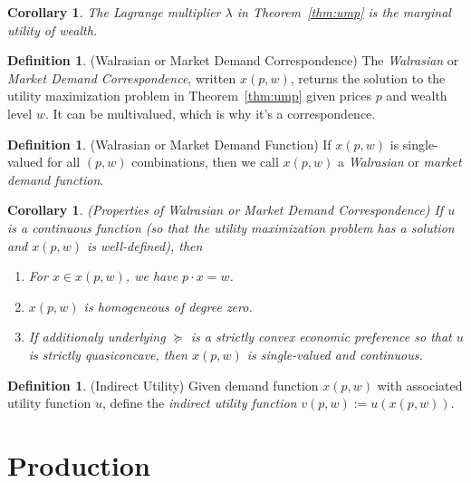 \documentclass[12pt]{article}
\theoremstyle{plain}
\newtheorem{cor}[thm]{Corollary}
\theoremstyle{definition}
\newtheorem{defn}[thm]{Definition}
\theoremstyle{remark}
\newcommand{\ra}{\rightarrow}
\newcommand{\calB}{\mathcal{B}}
\newcommand{\R}{\mathbb{R}}
\begin{document}
\begin{cor}
The Lagrange multiplier $\lambda$ in Theorem~\ref{thm:ump} is the
marginal utility of wealth.
\end{cor}

\begin{defn}(Walrasian or Market Demand Correspondence)
The \emph{Walrasian} or \emph{Market Demand Correspondence}, written
$x(p,w)$, returns the solution to the utility maximization problem in
Theorem~\ref{thm:ump} given prices $p$ and wealth level $w$.
It can be multivalued, which is why it's a correspondence.
\end{defn}

\begin{defn}(Walrasian or Market Demand Function)
If $x(p,w)$ is single-valued for all $(p,w)$ combinations, then we call
$x(p,w)$ a \emph{Walrasian} or \emph{market demand function}.
\end{defn}

\begin{cor}
\emph{(Properties of Walrasian or Market Demand Correspondence)}
If $u$ is a continuous function (so that the utility maximization
problem has a solution and $x(p,w)$ is well-defined), then
\begin{enumerate}
  \item For $x \in x(p,w)$, we have $p \cdot x = w$.
  \item $x(p,w)$ is homogeneous of degree zero.
  \item If additionaly underlying $\succeq$ is a strictly convex
    economic preference so that $u$ is strictly quasiconcave, then
    $x(p,w)$ is single-valued and continuous.
\end{enumerate}
\end{cor}

\begin{defn}(Indirect Utility)
Given demand function $x(p,w)$ with associated utility function $u$,
define the \emph{indirect utility function} $v(p,w):=u(x(p,w))$.
\end{defn}


\section{Production}
\end{document}

